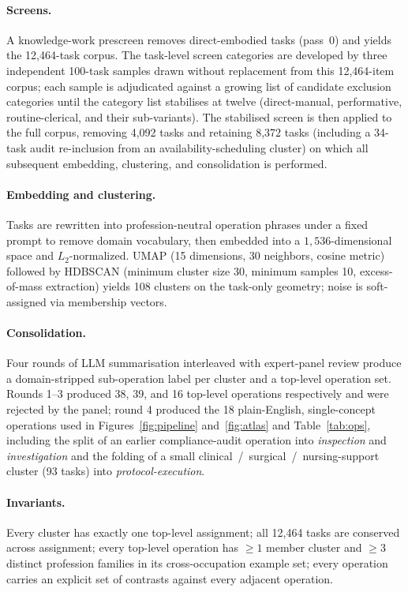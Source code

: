 \documentclass{article}
\begin{document}
\paragraph{Screens.} A knowledge-work prescreen removes direct-embodied tasks (pass~0) and yields the 12{,}464-task corpus.
The task-level screen categories are developed by three independent 100-task samples drawn without replacement from this 12{,}464-item corpus; each sample is adjudicated against a growing list of candidate exclusion categories until the category list stabilises at twelve (direct-manual, performative, routine-clerical, and their sub-variants).
The stabilised screen is then applied to the full corpus, removing 4{,}092 tasks and retaining 8{,}372 tasks (including a 34-task audit re-inclusion from an availability-scheduling cluster) on which all subsequent embedding, clustering, and consolidation is performed.

\paragraph{Embedding and clustering.} Tasks are rewritten into profession-neutral operation phrases under a fixed prompt to remove domain vocabulary, then embedded into a $1{,}536$-dimensional space and $L_{2}$-normalized.
UMAP (15 dimensions, 30 neighbors, cosine metric) followed by HDBSCAN (minimum cluster size 30, minimum samples 10, excess-of-mass extraction) yields 108 clusters on the task-only geometry; noise is soft-assigned via membership vectors.

\paragraph{Consolidation.} Four rounds of LLM summarisation interleaved with expert-panel review produce a domain-stripped sub-operation label per cluster and a top-level operation set.
Rounds 1--3 produced 38, 39, and 16 top-level operations respectively and were rejected by the panel; round 4 produced the 18 plain-English, single-concept operations used in Figures~\ref{fig:pipeline} and~\ref{fig:atlas} and Table~\ref{tab:ops}, including the split of an earlier compliance-audit operation into \emph{inspection} and \emph{investigation} and the folding of a small clinical~/~surgical~/~nursing-support cluster (93 tasks) into \emph{protocol-execution}.

\paragraph{Invariants.} Every cluster has exactly one top-level assignment; all 12{,}464 tasks are conserved across assignment; every top-level operation has $\geq\!1$ member cluster and $\geq\!3$ distinct profession families in its cross-occupation example set; every operation carries an explicit set of contrasts against every adjacent operation.
\end{document}
